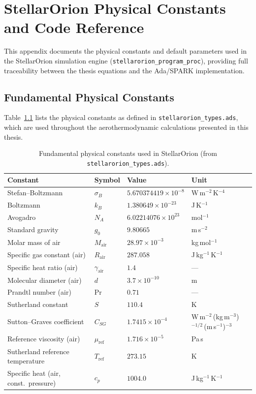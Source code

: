 \appendix

\chapter{StellarOrion Physical Constants and Code Reference}
\label{app:code_constants}

This appendix documents the physical constants and default parameters used in the StellarOrion simulation engine (\texttt{stellarorion\_program\_proc}), providing full traceability between the thesis equations and the Ada/SPARK implementation.

\section{Fundamental Physical Constants}
\label{sec:fundamental_constants}

Table~\ref{tab:constants} lists the physical constants as defined in \texttt{stellarorion\_types.ads}, which are used throughout the aerothermodynamic calculations presented in this thesis.

\begin{table}[H]
\centering
\caption{Fundamental physical constants used in StellarOrion (from \texttt{stellarorion\_types.ads}).}
\label{tab:constants}
\begin{tabular}{llll}
\hline
\textbf{Constant} & \textbf{Symbol} & \textbf{Value} & \textbf{Unit} \\
\hline
Stefan--Boltzmann & $\sigma_B$ & $5.670374419 \times 10^{-8}$ & W\,m$^{-2}$\,K$^{-4}$ \\
Boltzmann & $k_B$ & $1.380649 \times 10^{-23}$ & J\,K$^{-1}$ \\
Avogadro & $N_A$ & $6.02214076 \times 10^{23}$ & mol$^{-1}$ \\
Standard gravity & $g_0$ & $9.80665$ & m\,s$^{-2}$ \\
Molar mass of air & $M_{\text{air}}$ & $28.97 \times 10^{-3}$ & kg\,mol$^{-1}$ \\
Specific gas constant (air) & $R_{\text{air}}$ & $287.058$ & J\,kg$^{-1}$\,K$^{-1}$ \\
Specific heat ratio (air) & $\gamma_{\text{air}}$ & $1.4$ & --- \\
Molecular diameter (air) & $d$ & $3.7 \times 10^{-10}$ & m \\
Prandtl number (air) & $\text{Pr}$ & $0.71$ & --- \\
Sutherland constant & $S$ & $110.4$ & K \\
Sutton--Graves coefficient & $C_{SG}$ & $1.7415 \times 10^{-4}$ & W\,m$^{-2}$\,(kg\,m$^{-3}$)$^{-1/2}$\,(m\,s$^{-1}$)$^{-3}$ \\
Reference viscosity (air) & $\mu_{\text{ref}}$ & $1.716 \times 10^{-5}$ & Pa\,s \\
Sutherland reference temperature & $T_{\text{ref}}$ & $273.15$ & K \\
Specific heat (air, const.\ pressure) & $c_p$ & $1004.0$ & J\,kg$^{-1}$\,K$^{-1}$ \\
\hline
\end{tabular}
\end{table}

